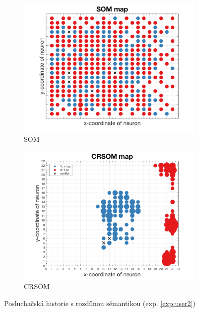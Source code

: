 \documentclass[thesis=M,czech]{FITthesis}[2012/06/26]
\begin{document}
\begin{figure}
\centering
\begin{subfigure}{.5\textwidth}
  \centering
  \includegraphics[width=.99\linewidth]{exp_user2_som.png}
  \caption{SOM}
  \label{fig:sub1}
\end{subfigure}%
\begin{subfigure}{.5\textwidth}
  \centering
  \includegraphics[width=.99\linewidth]{exp_user2_crsom.png}
  \caption{CRSOM}
  \label{fig:user2crsom}
\end{subfigure}
\caption{Posluchačská historie s rozdílnou sémantikou (exp. \ref{exp:user2})}
\label{fig:user2}
\end{figure}
\end{document}

